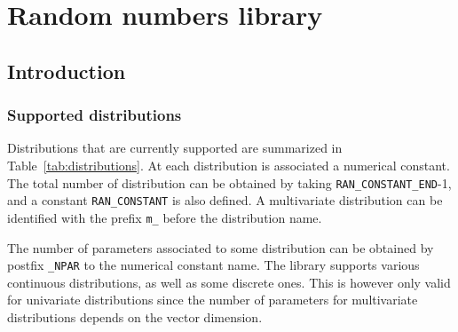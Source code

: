 \chapter{Random numbers library}
\label{chap:ran}

\section{Introduction}

\subsection{Supported distributions}

Distributions that are currently supported are summarized in
Table~\ref{tab:distributions}.
At each distribution is associated a numerical constant. The total number
of distribution can be obtained by taking \verb|RAN_CONSTANT_END|-1,
and a constant \verb|RAN_CONSTANT| is also defined.
A multivariate distribution can be identified with the prefix
\verb|m_| before the distribution name.

The number of parameters associated to some distribution can be
obtained by postfix \verb|_NPAR| to the numerical constant name. The
library supports various continuous distributions, as well as some
discrete ones.
This is however only valid for univariate distributions since the
number of parameters for multivariate distributions depends on the
vector dimension.

